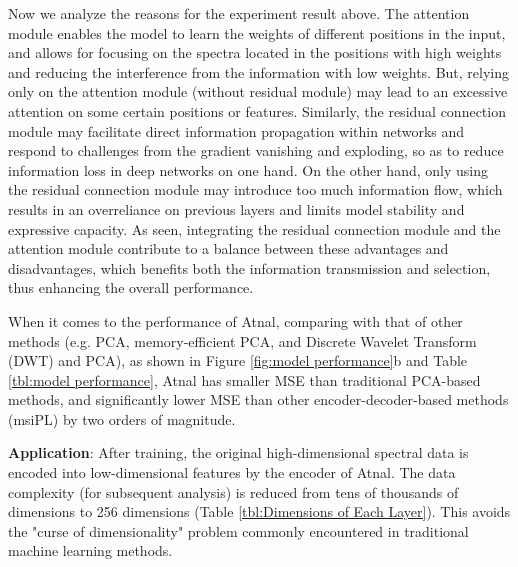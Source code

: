 \documentclass{WileyMSP-template}
\begin{document}
Now we analyze the reasons for the experiment result above. 
The attention module enables the model to learn the 
weights of different positions in the input, and allows for 
focusing on the spectra located in the positions with high weights 
and reducing the interference from the information with low weights. 
But, relying only 
on the attention module (without residual module) may lead 
to an excessive attention on some certain 
positions or features.
Similarly, the residual connection module may facilitate direct information 
propagation within networks and respond to challenges from the  gradient 
vanishing and exploding, so as to reduce information loss in deep 
networks on one hand. On the other hand, only using the residual 
connection module may introduce 
too much information flow, which results in an overreliance on previous 
layers and limits model stability and expressive capacity. 
As seen, integrating the residual connection module and the attention module 
contribute to a balance between these advantages and disadvantages, which benefits  
both the information transmission and selection, 
thus enhancing the overall performance.


When it comes to the performance of Atnal, comparing with that of other
methods (e.g. PCA, memory-efficient 
PCA, and Discrete Wavelet Transform (DWT) and PCA), 
as shown in Figure \ref{fig:model performance}b and Table \ref{tbl:model performance}, Atnal has smaller MSE than traditional 
PCA-based methods, and significantly lower MSE than other 
encoder-decoder-based methods (msiPL) by two orders of magnitude.



 
\textbf{Application}: After training, the original high-dimensional 
spectral data is encoded into 
low-dimensional features by the encoder of Atnal. 
The data complexity (for subsequent 
analysis) is reduced from tens of thousands of dimensions 
to 256 dimensions (Table \ref{tbl:Dimensions of Each Layer}). This avoids 
the "curse of dimensionality" problem commonly encountered in traditional machine 
learning methods. 
 
\end{document}
